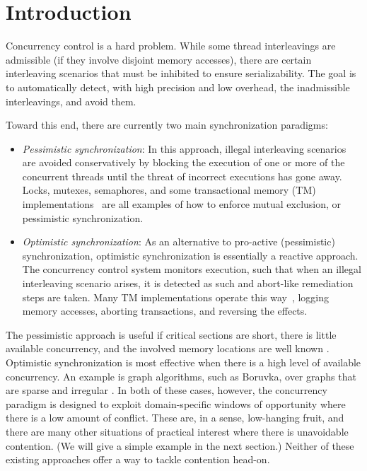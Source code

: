 \section{Introduction}\label{Se:intro}

Concurrency control is a hard problem. While some thread interleavings are admissible (if they involve disjoint memory accesses), there are certain interleaving scenarios that must be inhibited to ensure serializability. The goal is to automatically detect, with high precision and low overhead, the inadmissible interleavings, and avoid them.  

Toward this end, there are currently two main synchronization paradigms:
\begin{itemize}
	\item \textit{Pessimistic synchronization}: In this approach, illegal interleaving scenarios are avoided conservatively by blocking the execution of one or more of the concurrent threads until the threat of incorrect executions has gone away. Locks, mutexes, semaphores, and some transactional memory (TM) implementations~\cite{ppopp/HerlihyK08,nirpess} are all examples of how to enforce mutual exclusion, or pessimistic synchronization.
	\item \textit{Optimistic synchronization}: As an alternative to pro-active (pessimistic) synchronization, optimistic synchronization is essentially a reactive approach. The concurrency control system monitors execution, such that when an illegal interleaving scenario arises, it is detected as such and abort-like remediation steps are taken. Many TM implementations operate this way~\cite{DBLP:conf/isca/HerlihyM93}, logging memory accesses, aborting transactions, and reversing the effects.
\end{itemize}

\noindent
The pessimistic approach is useful if critical sections are short, there is little available concurrency, and the involved memory locations are well known \cite{AndiKleen}. Optimistic synchronization is most effective when there is a high level of available concurrency. An example is graph algorithms, such as Boruvka, over graphs that are sparse and irregular \cite{KulkarniGalois}.
%
In both of these cases, however, the concurrency paradigm is
  designed to exploit domain-specific windows of opportunity where
  there is a low amount of conflict.  These are, in a sense,
  low-hanging fruit, and there are many other situations of practical
  interest where there is unavoidable contention. (We will give a
  simple example in the next section.)  Neither of these existing
  approaches offer a way to tackle contention head-on.


